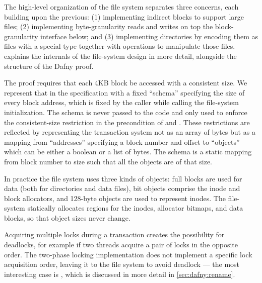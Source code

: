 The high-level organization of the file system separates three concerns, each
building upon the previous: (1) implementing indirect blocks to support large
files; (2) implementing byte-granularity
reads and writes on top the block-granularity interface below; and (3) implementing
directories by encoding them as files with a special type together with
operations to manipulate those files.  explains the
internals of the file-system design in more detail, alongside the structure of
the Dafny proof.


The proof requires that each 4KB block be accessed with a consistent size. We
represent that in the specification with a fixed ``schema'' specifying the
size of every block address, which is fixed by the caller while calling the
file-system initialization. The schema is never passed to the code and only used
to enforce the consistent-size restriction in the precondition of 
and . These restrictions are reflected by representing the
transaction system not as an array of bytes but as a mapping from
``addresses'' specifying a block number and offset to ``objects'' which can be
either a boolean or a list of bytes. The schema is a static mapping from block
number to size such that all the objects are of that size.

In practice the file system uses three kinds of objects: full blocks are used
for data (both for directories and data files), bit objects comprise the inode
and block allocators, and 128-byte objects are used to represent inodes. The
file-system statically allocates regions for the inodes, allocator bitmaps,
and data blocks, so that object sizes never change.

Acquiring multiple locks during a transaction creates the possibility
for deadlocks, for example if two threads acquire a pair of locks in the opposite
order. The two-phase locking implementation does not implement a
specific lock acquisition order, leaving it to the file system to
avoid deadlock --- the most interesting case is , which is discussed
in more detail in \cref{sec:dafny:rename}.
